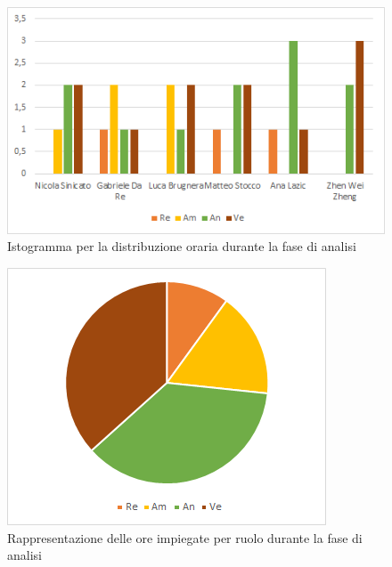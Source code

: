 \begin{figure}[H]
    \centering
    \includegraphics[scale=0.6]{img/grafi preventivo/istogrammi/analisi/periodo3.png}
    \caption{Istogramma per la distribuzione oraria durante la fase di analisi}
\end{figure}
\begin{figure}[H]
    \centering
    \includegraphics[scale=0.6]{img/grafi preventivo/torta/analisi/periodo3.png}
    \caption{Rappresentazione delle ore impiegate per ruolo durante la fase di analisi}
\end{figure}
%
